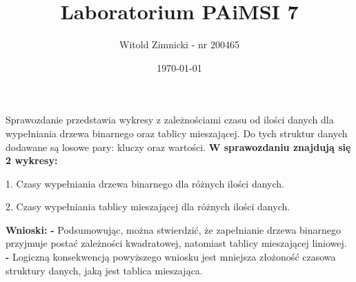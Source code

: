 \documentclass[12pt,a4paper,titlepage]{article}
\title{Laboratorium PAiMSI 7}
\date{\today}
\author{Witold Zimnicki - nr 200465}
\begin{document}
	\maketitle
	\pagestyle{empty}
	\pagestyle{headings}
	
	Sprawozdanie przedstawia wykresy z zależnościami czasu od ilości danych dla wypełniania drzewa binarnego oraz tablicy mieszającej. Do tych struktur danych dodawane są losowe pary: kluczy oraz wartości.
	\textbf{W sprawozdaniu znajdują się 2 wykresy:}\newline
	
	1. Czasy wypełniania drzewa binarnego dla różnych ilości danych. \newline
	 
	2. Czasy wypełniania tablicy mieszającej dla różnych ilości danych. \newline
	
	
	

		\newline
		\newline
	
	
	
\textbf{Wnioski: \newline	\newline}
\textbf{-} Podsumowując, można stwierdzić, że zapełnianie drzewa binarnego przyjmuje postać zależności kwadratowej, natomiast tablicy mieszającej liniowej. \newline
\newline
 \textbf{-} Logiczną konsekwencją powyższego wniosku jest mniejsza złożoność czasowa struktury danych, jaką jest tablica mieszająca. \newline
 
\end{document}
